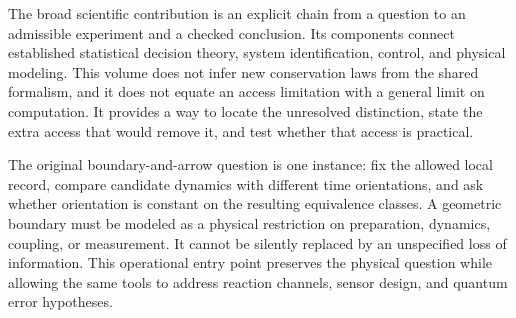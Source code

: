 The broad scientific contribution is an explicit chain from a question to
an admissible experiment and a checked conclusion. Its components connect
established statistical decision theory, system identification, control,
and physical modeling. This volume does not infer new conservation laws
from the shared formalism, and it does not equate an access limitation with
a general limit on computation. It provides a way to locate the unresolved
distinction, state the extra access that would remove it, and test whether
that access is practical.

The original boundary-and-arrow question is one instance: fix the allowed
local record, compare candidate dynamics with different time orientations,
and ask whether orientation is constant on the resulting equivalence
classes. A geometric boundary must be modeled as a physical restriction on
preparation, dynamics, coupling, or measurement. It cannot be silently
replaced by an unspecified loss of information. This operational entry point
preserves the physical question while allowing the same tools to address
reaction channels, sensor design, and quantum error hypotheses.
